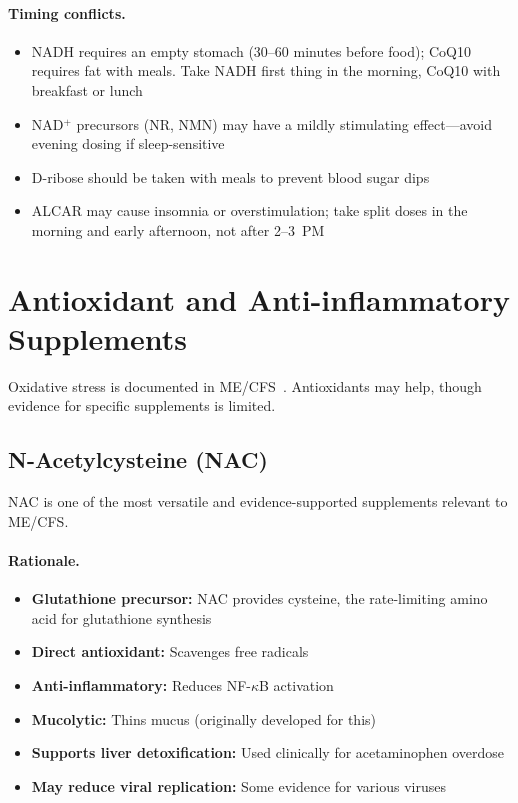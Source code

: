 \paragraph{Timing conflicts.}
\begin{itemize}
    \item NADH requires an empty stomach (30--60 minutes before food); CoQ10 requires fat with meals. Take NADH first thing in the morning, CoQ10 with breakfast or lunch
    \item NAD$^+$ precursors (NR, NMN) may have a mildly stimulating effect---avoid evening dosing if sleep-sensitive
    \item D-ribose should be taken with meals to prevent blood sugar dips
    \item ALCAR may cause insomnia or overstimulation; take split doses in the morning and early afternoon, not after 2--3~PM
\end{itemize}


\section{Antioxidant and Anti-inflammatory Supplements}
\label{sec:antioxidants}

Oxidative stress is documented in ME/CFS~\cite{Syed2025}. Antioxidants may help, though evidence for specific supplements is limited.

\subsection{N-Acetylcysteine (NAC)}

NAC is one of the most versatile and evidence-supported supplements relevant to ME/CFS.

\paragraph{Rationale.}
\begin{itemize}
    \item \textbf{Glutathione precursor:} NAC provides cysteine, the rate-limiting amino acid for glutathione synthesis
    \item \textbf{Direct antioxidant:} Scavenges free radicals
    \item \textbf{Anti-inflammatory:} Reduces NF-$\kappa$B activation
    \item \textbf{Mucolytic:} Thins mucus (originally developed for this)
    \item \textbf{Supports liver detoxification:} Used clinically for acetaminophen overdose
    \item \textbf{May reduce viral replication:} Some evidence for various viruses
\end{itemize}

